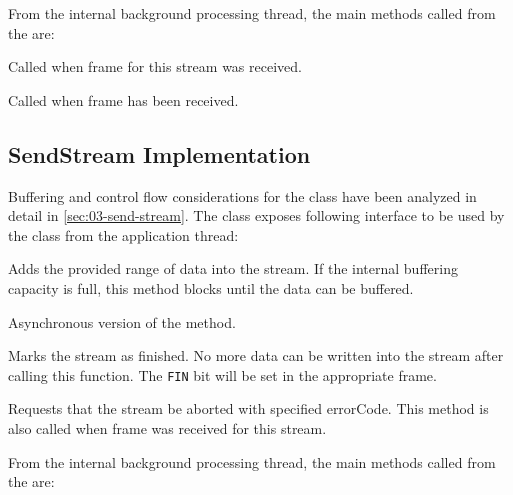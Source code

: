 From the internal background processing thread, the main methods called from the
\ManagedQuicConnection{} are:

\begin{description}

   Called when \RESETSTREAM{} frame
for this stream was received.

Called when \STREAM{} frame has been received.

\end{description}

\subsection{SendStream Implementation}

Buffering and control flow considerations for the \SendStream{} class have been analyzed in detail
in \autoref{sec:03-send-stream}. The \SendStream{} class exposes following interface to be used by
the \ManagedQuicStream{} class from the application thread:

\begin{description}

   Adds the provided range of
data into the stream. If the internal buffering capacity is full, this method blocks until the data
can be buffered.

   Asynchronous
version of the  method.

   Marks the stream as finished. No more data can be
written into the stream after calling this function. The \texttt{FIN} bit will be set in the
appropriate \STREAM{} frame.

   Requests that the stream be aborted
with specified errorCode. This method is also called when \STOPSENDING{} frame was received for this
stream.

\end{description}

From the internal background processing thread, the main methods called from the
\ManagedQuicConnection{} are:

